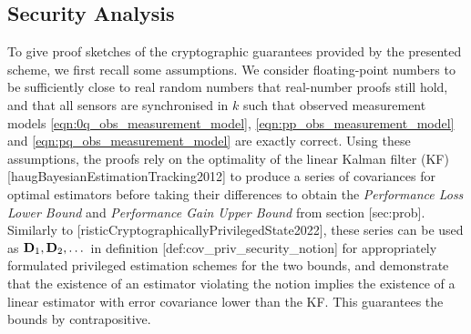 % 
% 
\subsection{Security Analysis}\label{subsec:priv_estimation:fus_security}
To give proof sketches of the cryptographic guarantees provided by the presented scheme, we first recall some assumptions. We consider floating-point numbers to be sufficiently close to real random numbers that real-number proofs still hold, and that all sensors are synchronised in $k$ such that observed measurement models \eqref{eqn:0q_obs_measurement_model}, \eqref{eqn:pp_obs_measurement_model} and \eqref{eqn:pq_obs_measurement_model} are exactly correct. Using these assumptions, the proofs rely on the optimality of the linear Kalman filter (KF) [haugBayesianEstimationTracking2012] to produce a series of covariances for optimal estimators before taking their differences to obtain the \textit{Performance Loss Lower Bound} and \textit{Performance Gain Upper Bound} from section [sec:prob]. Similarly to [risticCryptographicallyPrivilegedState2022], these series can be used as ${{\mathbf{D}}}_1,{{\mathbf{D}}}_2,\dots$ in definition [def:cov\_priv\_security\_notion] for appropriately formulated privileged estimation schemes for the two bounds, and demonstrate that the existence of an estimator violating the notion implies the existence of a linear estimator with error covariance lower than the KF. This guarantees the bounds by contrapositive.

% 
% 

